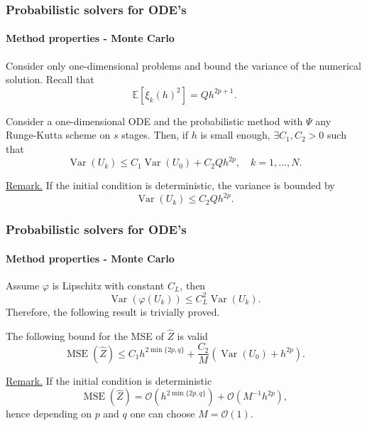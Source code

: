 \documentclass{beamer}
\newcommand{\E}{\mathbb{E}}
\newcommand{\MSE}{\operatorname{MSE}}
\newcommand{\Var}{\operatorname{Var}}
\newcommand{\OO}{\mathcal{O}}
\renewcommand{\phi}{\varphi}
\begin{document}
\begin{frame}
	\frametitle{Probabilistic solvers for ODE's}
	\framesubtitle{Method properties - Monte Carlo}	
	
	Consider only one-dimensional problems and bound the variance of the numerical solution. Recall that
	\begin{equation*}
		\E[\xi_k(h)^2] = Qh^{2p + 1}.
	\end{equation*}
	
	\begin{lemma} Consider a one-dimensional ODE and the probabilistic method with $\Psi$ any Runge-Kutta scheme on $s$ stages. Then, if $h$ is small enough, $\exists C_1, C_2 > 0$ such that
		\begin{equation*}
		\Var(U_k) \leq C_1\Var(U_0) + C_2Q h^{2p}, \quad k = 1, \ldots, N.
		\end{equation*}		
	\end{lemma}
	
	\underline{Remark.} If the initial condition is deterministic, the variance is bounded by 
	\begin{equation*}
		\Var(U_k) \leq C_2Qh^{2p}.
	\end{equation*}
\end{frame}

\begin{frame}
	\frametitle{Probabilistic solvers for ODE's}
	\framesubtitle{Method properties - Monte Carlo}	
	
	Assume $\phi$ is Lipschitz with constant $C_L$, then
	\begin{equation*}
		\Var(\phi(U_k)) \leq C_L^2 \Var(U_k).
	\end{equation*}
	Therefore, the following result is trivially proved.
	
	\begin{theorem} The following bound for the MSE of $\hat Z$ is valid
		\begin{equation*}
			\MSE(\hat Z) \leq C_1 h^{2\min\{2p, q\}} + \frac{C_2}{M} (\Var(U_0) + h^{2p}).
		\end{equation*}	
	\end{theorem}
	
	\underline{Remark.} If the initial condition is deterministic
	\begin{equation*}
		\MSE(\hat Z) = \OO(h^{2\min\{2p, q\}}) + \OO(M^{-1}h^{2p}),
	\end{equation*}
	hence depending on $p$ and $q$ one can choose $M = \OO(1)$.
\end{frame}
\end{document}

